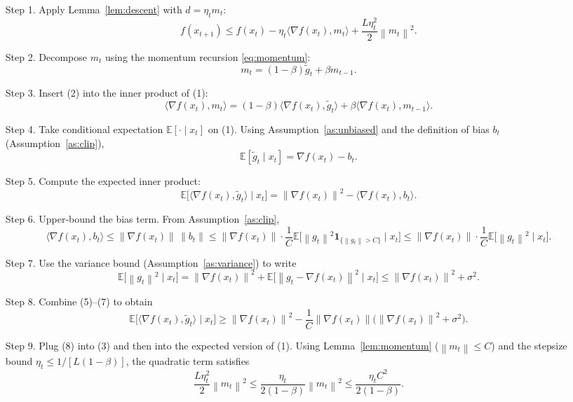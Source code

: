 \documentclass{article}
\newcommand{\E}{\mathbb{E}}
\newcommand{\norm}[1]{\left\lVert #1 \right\rVert}
\begin{document}
\begin{enumerate}
\item[Step 1.] Apply Lemma~\ref{lem:descent} with $d=\eta_t m_t$:
\[
f(x_{t+1})\le f(x_t)-\eta_t\langle\nabla f(x_t),m_t\rangle
            +\frac{L\eta_t^{2}}{2}\norm{m_t}^{2}.
\tag{1}
\]

\item[Step 2.] Decompose $m_t$ using the momentum recursion \eqref{eq:momentum}:
\[
m_t = (1-\beta)\tilde g_t + \beta m_{t-1}.
\tag{2}
\]

\item[Step 3.] Insert (2) into the inner product of (1):
\[
\langle\nabla f(x_t),m_t\rangle
= (1-\beta)\langle\nabla f(x_t),\tilde g_t\rangle
  +\beta\langle\nabla f(x_t),m_{t-1}\rangle .
\tag{3}
\]

\item[Step 4.] Take conditional expectation $\E[\cdot\mid x_t]$ on (1).  
Using Assumption~\ref{as:unbiased} and the definition of bias $b_t$ (Assumption~\ref{as:clip}),
\[
\E[\tilde g_t\mid x_t]=\nabla f(x_t)-b_t .
\tag{4}
\]

\item[Step 5.] Compute the expected inner product:
\[
\E\!\big[\langle\nabla f(x_t),\tilde g_t\rangle\mid x_t\big]
= \norm{\nabla f(x_t)}^{2}-\langle\nabla f(x_t),b_t\rangle .
\tag{5}
\]

\item[Step 6.] Upper‑bound the bias term. From Assumption~\ref{as:clip},
\[
\langle\nabla f(x_t),b_t\rangle
\le \norm{\nabla f(x_t)}\,\norm{b_t}
\le \norm{\nabla f(x_t)}\cdot\frac{1}{C}\E\!\big[\norm{g_t}^{2}\mathbf{1}_{\{\norm{g_t}>C\}}\mid x_t\big]
\le \norm{\nabla f(x_t)}\cdot\frac{1}{C}\E\!\big[\norm{g_t}^{2}\mid x_t\big].
\tag{6}
\]

\item[Step 7.] Use the variance bound (Assumption~\ref{as:variance}) to write
\[
\E\!\big[\norm{g_t}^{2}\mid x_t\big]
= \norm{\nabla f(x_t)}^{2}+ \E\!\big[\norm{g_t-\nabla f(x_t)}^{2}\mid x_t\big]
\le \norm{\nabla f(x_t)}^{2}+\sigma^{2}.
\tag{7}
\]

\item[Step 8.] Combine (5)–(7) to obtain
\[
\E\!\big[\langle\nabla f(x_t),\tilde g_t\rangle\mid x_t\big]
\ge \norm{\nabla f(x_t)}^{2}
      -\frac{1}{C}\norm{\nabla f(x_t)}\big(\norm{\nabla f(x_t)}^{2}+\sigma^{2}\big).
\tag{8}
\]

\item[Step 9.] Plug (8) into (3) and then into the expected version of (1).  
Using Lemma~\ref{lem:momentum} ($\norm{m_t}\le C$) and the stepsize bound $\eta_t\le 1/[L(1-\beta)]$,
the quadratic term satisfies
\[
\frac{L\eta_t^{2}}{2}\norm{m_t}^{2}\le \frac{\eta_t}{2(1-\beta)}\norm{m_t}^{2}
\le \frac{\eta_t C^{2}}{2(1-\beta)} .
\tag{9}
\]


\end{enumerate}
\end{document}
